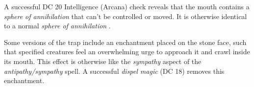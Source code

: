 \documentclass[
]{article}
\begin{document}
A successful DC 20 Intelligence (Arcana) check reveals that the mouth
contains a \emph{sphere of annihilation} that can't be controlled or
moved. It is otherwise identical to a normal \emph{sphere of
annihilation} .

Some versions of the trap include an enchantment placed on the stone
face, such that specified creatures feel an overwhelming urge to
approach it and crawl inside its mouth. This effect is otherwise like
the \emph{sympathy} aspect of the \emph{antipathy/sympathy} spell. A
successful \emph{dispel magic} (DC 18) removes this enchantment.
\end{document}
